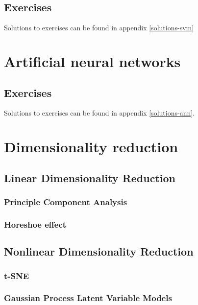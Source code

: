 \documentclass[]{book}
\theoremstyle{definition}
\theoremstyle{definition}
\theoremstyle{definition}
\theoremstyle{remark}
\begin{document}
\section{Exercises}\label{exercises-4}

Solutions to exercises can be found in appendix \ref{solutions-svm}

\chapter{Artificial neural networks}\label{ann}

\section{Exercises}\label{exercises-5}

Solutions to exercises can be found in appendix \ref{solutions-ann}.

\chapter{Dimensionality reduction}\label{dimensionality-reduction}

\section{Linear Dimensionality
Reduction}\label{linear-dimensionality-reduction}

\subsection{Principle Component
Analysis}\label{principle-component-analysis}

\subsection{Horeshoe effect}\label{horeshoe-effect}

\section{Nonlinear Dimensionality
Reduction}\label{nonlinear-dimensionality-reduction}

\subsection{t-SNE}\label{t-sne}

\subsection{Gaussian Process Latent Variable
Models}\label{gaussian-process-latent-variable-models}
\end{document}
